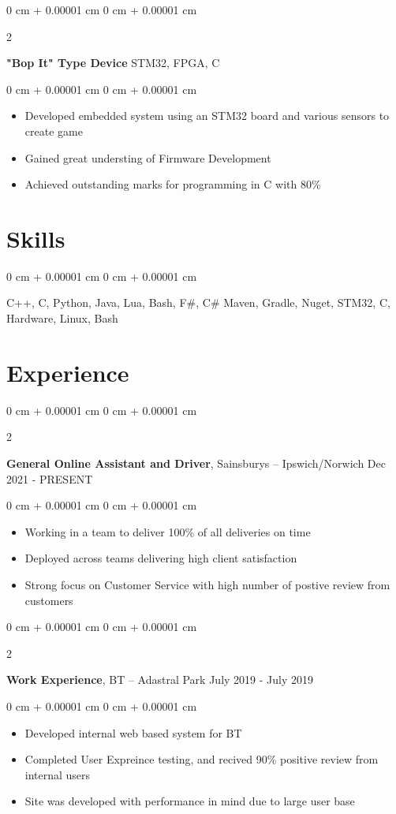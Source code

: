 \documentclass[10pt, letterpaper]{article}
\newenvironment{highlights}{
    \begin{itemize}[
        topsep=0.10 cm,
        parsep=0.10 cm,
        partopsep=0pt,
        itemsep=0pt,
        leftmargin=0 cm + 10pt
    ]
}{
    \end{itemize}
} %
\newenvironment{onecolentry}{
    \begin{adjustwidth}{
        0 cm + 0.00001 cm
    }{
        0 cm + 0.00001 cm
    }
}{
    \end{adjustwidth}
} %
\newenvironment{twocolentry}[2][]{
    \onecolentry
    \def\secondColumn{#2}
    \setcolumnwidth{\fill, 4.5 cm}
    \begin{paracol}{2}
}{
    \switchcolumn \raggedleft \secondColumn
    \end{paracol}
    \endonecolentry
} %
\begin{document}
\vspace{0.2 cm}

\begin{twocolentry}{
		STM32, FPGA, C
	}
	\textbf{"Bop It" Type Device}\end{twocolentry}

\vspace{0.10 cm}
\begin{onecolentry}
	\begin{highlights}
		\item Developed embedded system using an STM32 board and various sensors to create game
		\item Gained great understing of Firmware Development
		\item Achieved outstanding marks for programming in C with 80\%
	\end{highlights}
\end{onecolentry}

\section{Skills}
\begin{onecolentry}
	C++, C, Python, Java, Lua, Bash, F\#, C\# Maven, Gradle, Nuget, STM32, C, Hardware, Linux, Bash
\end{onecolentry}
\section{Experience}

\begin{twocolentry}{
		Dec 2021 - PRESENT
	}
	\textbf{General Online Assistant and Driver}, Sainsburys -- Ipswich/Norwich\end{twocolentry}
\begin{onecolentry}
	\begin{highlights}
		\item Working in a team to deliver 100\% of all deliveries on time
		\item Deployed across teams delivering high client satisfaction
		\item Strong focus on Customer Service with high number of postive review from customers
	\end{highlights}
\end{onecolentry}

\vspace{0.2 cm}
\begin{twocolentry}{
		July 2019 - July 2019
	}
	\textbf{Work Experience}, BT -- Adastral Park\end{twocolentry}
\begin{onecolentry}
	\begin{highlights}
		\item Developed internal web based system for BT
		\item Completed User Expreince testing, and recived 90\% positive review from internal users
		\item Site was developed with performance in mind due to large user base
	\end{highlights}
\end{onecolentry}
\end{document}
